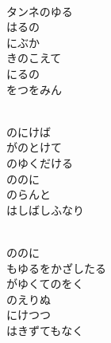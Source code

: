 \documentclass[10pt,b5j]{tarticle} %
\begin{document}
\vspace{1.5em} %
\newcommand{\linespace}{0.5em} %
\newcommand{\blocksize}{0.5\hsize} %
\newcommand{\itemmargin}{6em} %
\begin{enumerate} %
    \setlength{\itemindent}{\itemmargin} %
    \begin{minipage}[c]{\blocksize}
    
        \vspace{\linespace}
        \item~\\
        タンネのゆる\\
        はるの\\
        にぶか\\
        きのこえて\\
        にるの\\
        をつをみん
        
        \vspace{\linespace}
        \item~\\
        のにけば\\
        がのとけて\\
        のゆくだける\\
        ののに\\
        のらんと\\
        はしばしふなり
        
        \vspace{\linespace}
        \item~\\
        ののに\\
        もゆるをかざしたる\\
        がゆくてのをく\\
        のえりぬ\\
        にけつつ\\
        はきずてもなく
        

\end{minipage}
\end{enumerate}
\end{document}

